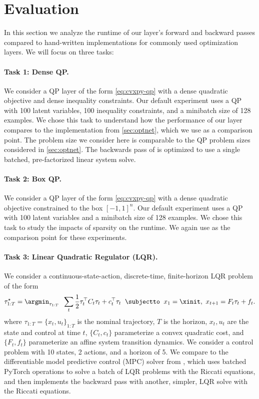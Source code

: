 \newpage
\section{Evaluation}
\label{sec:eval}

In this section we analyze the runtime of our layer's forward
and backward passes compared to hand-written implementations
for commonly used optimization layers.
We will focus on three tasks:

\paragraph{Task 1: Dense QP.}
We consider a QP layer of the form
\cref{eq:cvxpy-qp} with a dense quadratic objective
and dense inequality constraints.
Our default experiment uses a QP with 100 latent
variables, 100 inequality constraints, and
a minibatch size of 128 examples.
We chose this task to understand how the performance
of our \cvxpy{} layer compares to the \qpth implementation
from \cref{sec:optnet}, which we use as a comparison point.
The problem size we consider here is comparable
to the QP problem sizes considered in \cref{sec:optnet}.
The backwards pass of \qpth is optimized to use a single
batched, pre-factorized linear system solve.

\paragraph{Task 2: Box QP.}
We consider a QP layer of the form
\cref{eq:cvxpy-qp} with a dense quadratic objective
constrained to the box $[-1, 1]^n$.
Our default experiment uses a QP with 100 latent
variables and a minibatch size of 128 examples.
We chose this task to study the impacts of
sparsity on the runtime.
We again use \qpth as the comparison point for these experiments.

\paragraph{Task 3: Linear Quadratic Regulator (LQR).}
We consider a continuous-state-action, discrete-time, finite-horizon
LQR problem of the form
\begin{equation}
  \label{eq:cvxpyth:lqr}
  \tau^{\star}_{1:T} = \argmin_{\tau_{1:T}}\;\;
  \sum_{t} \frac{1}{2} \tau_t^\top  C_t \tau_t + c_t^\top  \tau_t \;\;
  \subjectto\;\;
  x_1 = \xinit,\
  x_{t+1} = F_t\tau_t + f_t.
\end{equation}
where $\tau_{1:T} = \{x_t, u_t\}_{1:T}$ is the nominal trajectory,
$T$ is the horizon,
$x_t, u_t$ are the state and control at time $t$,
$\{C_t, c_t\}$ parameterize a convex quadratic cost,
and $\{F_t, f_t\}$ parameterize an affine system
transition dynamics.
We consider a control problem with 10 states,
2 actions, and a horizon of 5.
We compare to the differentiable model
predictive control (MPC) solver from
\citep{amos2018differentiable}, which uses batched
PyTorch operations to solve a batch of LQR problems with
the Riccati equations, and then implements the backward
pass with another, simpler, LQR solve with
the Riccati equations.

